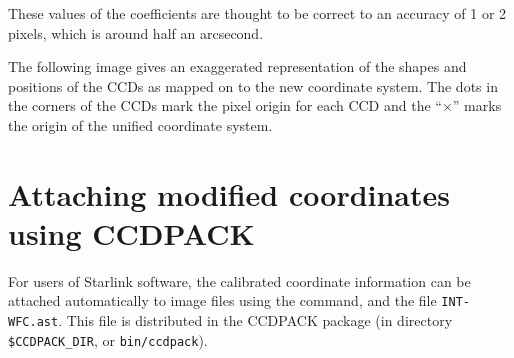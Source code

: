 \documentclass[11pt]{article}
\begin{document}
These values of the coefficients are thought to be correct to an
accuracy of 1 or 2 pixels, which is around half an arcsecond.

The following image gives an exaggerated representation of the 
shapes and positions of the CCDs as mapped on to the new coordinate system.
The dots in the corners of the CCDs mark the pixel origin for each CCD
and the ``$\times$'' marks the origin of the unified coordinate system.
\begin{quote}
\begin{center}
\end{center}
\end{quote}


\latexhtml{\newpage}{\htmlrule}
\section{Attaching modified coordinates using CCDPACK}

For users of Starlink software,
the calibrated coordinate information can be attached automatically
to image files using the 
command, and the file {\tt INT-WFC.ast}.
This file is distributed in the CCDPACK package 
(in directory {\tt \$CCDPACK\_DIR}, or {\tt bin/ccdpack}).
\end{document}
